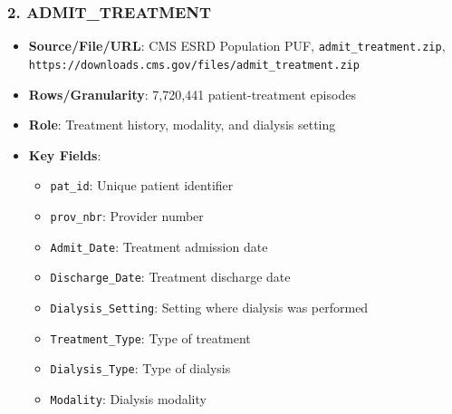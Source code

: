 \documentclass[conference]{IEEEtran}
\begin{document}
\subsubsection{2. ADMIT_TREATMENT}
\begin{itemize}
    \item \textbf{Source/File/URL}: CMS ESRD Population PUF, \texttt{admit_treatment.zip}, \texttt{https://downloads.cms.gov/files/admit_treatment.zip}
    \item \textbf{Rows/Granularity}: 7,720,441 patient-treatment episodes
    \item \textbf{Role}: Treatment history, modality, and dialysis setting
    \item \textbf{Key Fields}:
    \begin{itemize}
        \item \texttt{pat_id}: Unique patient identifier
        \item \texttt{prov_nbr}: Provider number
        \item \texttt{Admit_Date}: Treatment admission date
        \item \texttt{Discharge_Date}: Treatment discharge date
        \item \texttt{Dialysis_Setting}: Setting where dialysis was performed
        \item \texttt{Treatment_Type}: Type of treatment
        \item \texttt{Dialysis_Type}: Type of dialysis
        \item \texttt{Modality}: Dialysis modality
    \end{itemize}
\end{itemize}
\end{document}
